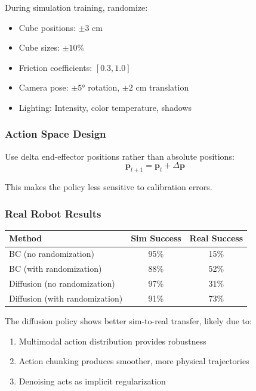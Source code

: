 During simulation training, randomize:
\begin{itemize}
    \item Cube positions: $\pm 3$ cm
    \item Cube sizes: $\pm 10\%$
    \item Friction coefficients: $[0.3, 1.0]$
    \item Camera pose: $\pm 5°$ rotation, $\pm 2$ cm translation
    \item Lighting: Intensity, color temperature, shadows
\end{itemize}

\subsubsection{Action Space Design}

Use delta end-effector positions rather than absolute positions:
\begin{equation}
\mathbf{p}_{t+1} = \mathbf{p}_t + \Delta\mathbf{p}
\label{eq:delta_actions}
\end{equation}

This makes the policy less sensitive to calibration errors.

\subsubsection{Real Robot Results}

\begin{center}
\begin{tabular}{lcc}
\toprule
\textbf{Method} & \textbf{Sim Success} & \textbf{Real Success} \\
\midrule
BC (no randomization) & 95\% & 15\% \\
BC (with randomization) & 88\% & 52\% \\
Diffusion (no randomization) & 97\% & 31\% \\
Diffusion (with randomization) & 91\% & 73\% \\
\bottomrule
\end{tabular}
\end{center}

The diffusion policy shows better sim-to-real transfer, likely due to:
\begin{enumerate}
    \item Multimodal action distribution provides robustness
    \item Action chunking produces smoother, more physical trajectories
    \item Denoising acts as implicit regularization
\end{enumerate}

